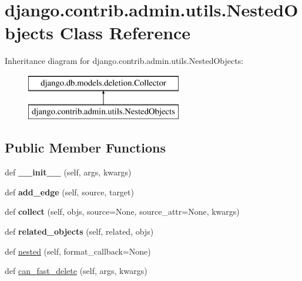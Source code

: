\hypertarget{classdjango_1_1contrib_1_1admin_1_1utils_1_1_nested_objects}{}\section{django.\+contrib.\+admin.\+utils.\+Nested\+Objects Class Reference}
\label{classdjango_1_1contrib_1_1admin_1_1utils_1_1_nested_objects}
Inheritance diagram for django.\+contrib.\+admin.\+utils.\+Nested\+Objects\+:\begin{figure}[H]
\begin{center}
\leavevmode
\includegraphics[height=2.000000cm]{classdjango_1_1contrib_1_1admin_1_1utils_1_1_nested_objects}
\end{center}
\end{figure}
\subsection*{Public Member Functions}
\begin{DoxyCompactItemize}
\item 
\mbox{\label{classdjango_1_1contrib_1_1admin_1_1utils_1_1_nested_objects_a179d1cb05fb096c850b1e3aca572221c}} 
def {\bfseries \+\_\+\+\_\+init\+\_\+\+\_\+} (self, args, kwargs)
\item 
\mbox{\label{classdjango_1_1contrib_1_1admin_1_1utils_1_1_nested_objects_ada405afe0afcbe2eca029a90bfde7c23}} 
def {\bfseries add\+\_\+edge} (self, source, target)
\item 
\mbox{\label{classdjango_1_1contrib_1_1admin_1_1utils_1_1_nested_objects_a7803213d24fc50aeeeb932b9746a6c9f}} 
def {\bfseries collect} (self, objs, source=None, source\+\_\+attr=None, kwargs)
\item 
\mbox{\label{classdjango_1_1contrib_1_1admin_1_1utils_1_1_nested_objects_ad9e38dc7dbdb8865cf31ae3cba610206}} 
def {\bfseries related\+\_\+objects} (self, related, objs)
\item 
def \mbox{\hyperlink{classdjango_1_1contrib_1_1admin_1_1utils_1_1_nested_objects_afbdc67f5d571f29ac802a0ed270238a3}{nested}} (self, format\+\_\+callback=None)
\item 
def \mbox{\hyperlink{classdjango_1_1contrib_1_1admin_1_1utils_1_1_nested_objects_a356abe52ef30378dd34adec7efd360d7}{can\+\_\+fast\+\_\+delete}} (self, args, kwargs)
\end{DoxyCompactItemize}
